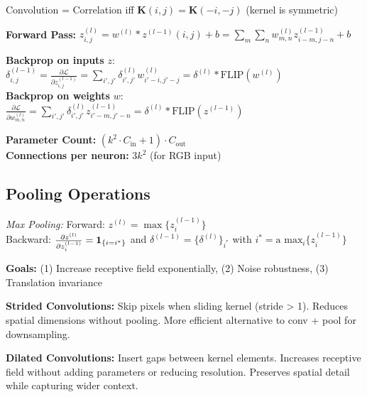 \begin{highlightbox*}[gray!30]
Convolution = Correlation iff $\mathbf{K}(i,j) = \mathbf{K}(-i,-j)$ (kernel is symmetric)
\end{highlightbox*}



\textbf{Forward Pass:} $z_{i,j}^{(l)} = w^{(l)} * z^{(l-1)}(i,j) + b = \sum_m \sum_n w_{m,n}^{(l)} z_{i-m,j-n}^{(l-1)} + b$

{\small
\textbf{Backprop on inputs} $z$: $\delta_{i,j}^{(l-1)} = \frac{\partial \mathcal{L}}{\partial z_{i,j}^{(l-1)}} = \sum_{i',j'} \delta_{i',j'}^{(l)} w_{i'-i,j'-j}^{(l)} = \delta^{(l)} * \text{FLIP}(w^{(l)})$\\
\textbf{Backprop on weights} $w$: $\frac{\partial \mathcal{L}}{\partial w_{m,n}^{(l)}} = \sum_{i',j'} \delta_{i',j'}^{(l)} z_{i'-m,j'-n}^{(l-1)} = \delta^{(l)} * \text{FLIP}(z^{(l-1)})$
}


\textbf{Parameter Count:} $(k^2 \cdot C_{\text{in}} + 1) \cdot C_{\text{out}}$\\
\textbf{Connections per neuron:} $3k^2$ (for RGB input)


\subsection{Pooling Operations}

\emph{Max Pooling:} 
Forward: $z^{(l)} = \max\{z^{(l-1)}_i\}$\\
Backward: $\frac{\partial z^{(l)}}{\partial z^{(l-1)}_i} = \mathbf{1}_{\{i = i^*\}}$ and
$\delta^{(l-1)}=\{ \delta^{(l)}\}_{i^*}$ with {\small $i^* = \text{a max}_i\{ z^{(l-1)}_i \}$}

\textbf{Goals:} (1) Increase receptive field exponentially, (2) Noise robustness, (3) Translation invariance

\textbf{Strided Convolutions:} Skip pixels when sliding kernel (stride > 1). Reduces spatial dimensions without pooling. More efficient alternative to conv + pool for downsampling.

\textbf{Dilated Convolutions:} Insert gaps between kernel elements. Increases receptive field without adding parameters or reducing resolution. Preserves spatial detail while capturing wider context.

